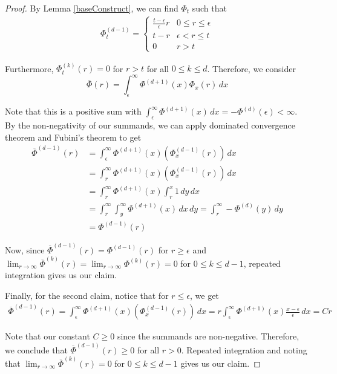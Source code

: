 \begin{proof}
By Lemma \ref{baseConstruct}, we can find $\Phi_t$ such that
\begin{align*}
\Phi_t^{(d-1)} = \begin{cases}
\frac{t-\epsilon}{\epsilon } r & 0 \leq r \leq \epsilon \\
t - r & \epsilon < r \leq t \\
0 & r > t
\end{cases}
\end{align*}

Furthermore, $\Phi_t^{(k)}(r) = 0$ for $r > t$ for all $0 \leq k \leq d$.
Therefore, we consider 
%
\[\overline{\Phi}(r) = \int_{\epsilon}^\infty \Phi^{(d+1)}(x) \Phi_x(r) \, dx\] 

Note that this is a positive sum with $\int_{\epsilon}^\infty \Phi^{(d+1)}(x) \, dx = -\Phi^{(d)}(\epsilon) < \infty$. By the non-negativity of our summands, we can apply dominated convergence theorem and Fubini's theorem to get
\begin{align*}
\overline{\Phi}^{(d-1)}(r) & = \int_{\epsilon}^\infty  \Phi^{(d+1)}(x) (\Phi_x^{(d-1)}(r)) \, dx \\
& = \int_{r}^\infty  \Phi^{(d+1)}(x) (\Phi_x^{(d-1)}(r)) \, dx \\
& = \int_r^\infty \Phi^{(d+1)}(x) \int_r^x 1 \, dy \,dx  \\
& = \int_r^\infty \int_y^\infty \Phi^{(d+1)}(x) \, dx \, dy = \int_r^\infty  -\Phi^{(d)}(y) \, dy \\
& = \Phi^{(d-1)}(r)
\end{align*}

Now, since $\overline{\Phi}^{(d-1)}(r) = \Phi^{(d-1)}(r)$ for $r\geq \epsilon$ and $\lim_{r\to\infty} \overline{\Phi}^{(k)}(r) = \lim_{r\to\infty} {\Phi}^{(k)}(r) = 0$ for $0 \leq k \leq d-1$, repeated integration gives us our claim. 

Finally, for the second claim, notice that for $r \leq \epsilon$, we get
\begin{align*}
\overline{\Phi}^{(d-1)}(r) = \int_{\epsilon}^\infty  \Phi^{(d+1)}(x) (\Phi_x^{(d-1)}(r)) \, dx
=  r \int_\epsilon^\infty \Phi^{(d+1)}(x) \frac{x - \epsilon}{\epsilon} \, dx = Cr  
\end{align*}

Note that our constant $C \geq 0$ since the summands are non-negative. Therefore, we conclude that $\overline{\Phi}^{(d-1)}(r) \geq 0$ for all $r > 0$. Repeated integration and noting that $\lim_{r\to\infty} \overline{\Phi}^{(k)}(r) = 0$ for $0 \leq k \leq d-1$ gives us our claim.


\end{proof}
